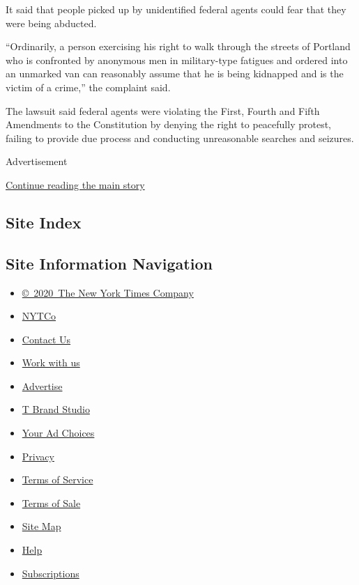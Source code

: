 It said that people picked up by unidentified federal agents could fear
that they were being abducted.

``Ordinarily, a person exercising his right to walk through the streets
of Portland who is confronted by anonymous men in military-type fatigues
and ordered into an unmarked van can reasonably assume that he is being
kidnapped and is the victim of a crime,'' the complaint said.

The lawsuit said federal agents were violating the First, Fourth and
Fifth Amendments to the Constitution by denying the right to peacefully
protest, failing to provide due process and conducting unreasonable
searches and seizures.

Advertisement

\protect\hyperlink{after-bottom}{Continue reading the main story}

\hypertarget{site-index}{%
\subsection{Site Index}\label{site-index}}

\hypertarget{site-information-navigation}{%
\subsection{Site Information
Navigation}\label{site-information-navigation}}

\begin{itemize}
\tightlist
\item
  \href{https://help.nytimes.com/hc/en-us/articles/115014792127-Copyright-notice}{©~2020~The
  New York Times Company}
\end{itemize}

\begin{itemize}
\tightlist
\item
  \href{https://www.nytco.com/}{NYTCo}
\item
  \href{https://help.nytimes.com/hc/en-us/articles/115015385887-Contact-Us}{Contact
  Us}
\item
  \href{https://www.nytco.com/careers/}{Work with us}
\item
  \href{https://nytmediakit.com/}{Advertise}
\item
  \href{http://www.tbrandstudio.com/}{T Brand Studio}
\item
  \href{https://www.nytimes.com/privacy/cookie-policy\#how-do-i-manage-trackers}{Your
  Ad Choices}
\item
  \href{https://www.nytimes.com/privacy}{Privacy}
\item
  \href{https://help.nytimes.com/hc/en-us/articles/115014893428-Terms-of-service}{Terms
  of Service}
\item
  \href{https://help.nytimes.com/hc/en-us/articles/115014893968-Terms-of-sale}{Terms
  of Sale}
\item
  \href{https://spiderbites.nytimes.com}{Site Map}
\item
  \href{https://help.nytimes.com/hc/en-us}{Help}
\item
  \href{https://www.nytimes.com/subscription?campaignId=37WXW}{Subscriptions}
\end{itemize}
